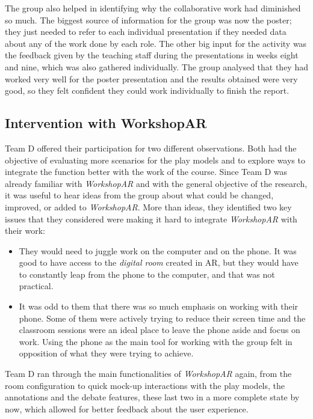 The group also helped in identifying why the collaborative work had diminished so much. The biggest source of information for the group was now the poster; they just
needed to refer to each individual presentation if they needed data about any of the work done by each role. The other big input for the activity was the feedback given by
the teaching staff during the presentations in weeks eight and nine, which was also gathered individually. The group analysed that they had worked very well for the poster
presentation and the results obtained were very good, so they felt confident they could work individually to finish the report.

\subsection{Intervention with WorkshopAR \label{sec:6-6-2}}

Team D offered their participation for two different observations. Both had the objective of evaluating more scenarios for the play models and to explore ways to integrate
the function better with the work of the course. Since Team D was already familiar with \emph{WorkshopAR} and with the general objective of the research, it was useful to
hear ideas from the group about what could be changed, improved, or added to \emph{WorkshopAR}. More than ideas, they identified two key issues that they considered were
making it hard to integrate \emph{WorkshopAR} with their work:

\begin{itemize}
    \item They would need to juggle work on the computer and on the phone. It was good to have access to the \emph{digital room} created in \ac{AR}, but they would have to
    constantly leap from the phone to the computer, and that was not practical.
    \item It was odd to them that there was so much emphasis on working with their phone. Some of them were actively trying to reduce their screen time and the classroom
    sessions were an ideal place to leave the phone aside and focus on work. Using the phone as the main tool for working with the group felt in opposition of what they
    were trying to achieve.
\end{itemize}

Team D ran through the main functionalities of \emph{WorkshopAR} again, from the room configuration to quick mock-up interactions with the play models, the annotations and
the debate features, these last two in a more complete state by now, which allowed for better feedback about the user experience.

